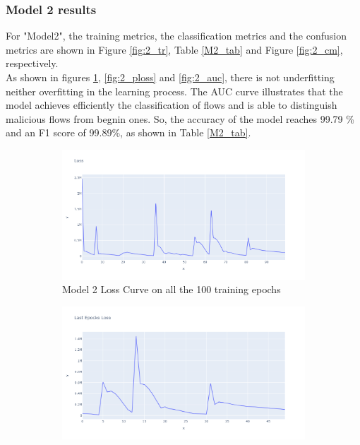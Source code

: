 \subsubsection{Model 2 results}
  For "Model2", the training metrics, the classification metrics and the confusion metrics are shown in Figure \ref{fig:2_tr}, Table \ref{M2_tab} and Figure \ref{fig:2_cm}, respectively.\\
  As shown in figures \ref{fig:2_tloss}, \ref{fig:2_ploss} and \ref{fig:2_auc}, there is not underfitting neither overfitting in the learning process. The AUC curve illustrates that the model achieves efficiently the classification of flows and is able to distinguish  malicious flows from begnin ones. So, the accuracy of the model reaches 99.79 \% and an F1 score of 99.89\%, as shown in Table \ref{M2_tab}.
\begin{figure}[H]%
    \centering
    \begin{subfigure}{0.49\textwidth}
        \centering
        \includegraphics[width=\linewidth]{figures/ev/2_tloss.png}
        \caption{Model 2 Loss Curve on all the 100 training epochs}
    \label{fig:2_tloss}
    \end{subfigure}
    \begin{subfigure}{0.49\textwidth}
        \centering
         \includegraphics[width=\linewidth]{figures/ev/2_ploss.png}

\end{subfigure}
\end{figure}
